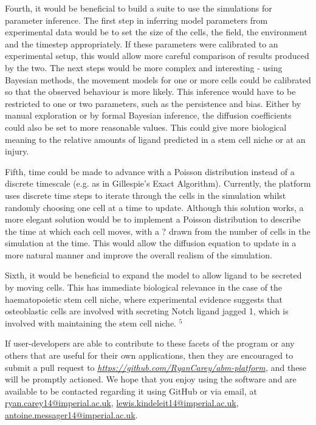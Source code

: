 \documentclass[12pt,a4paper]{report}
\begin{document}
Fourth, it would be beneficial to build a suite to use the simulations 
for parameter inference. The first step in inferring model parameters 
from experimental data would be to set the size of the cells, the field, 
the environment and the timestep appropriately. If these parameters were 
calibrated to an experimental setup, this would allow more careful 
comparison of results produced by the two. The next steps would be more 
complex and interesting - using Bayesian methods, the movement models 
for one or more cells could be calibrated so that the observed behaviour 
is more likely. This inference would have to be restricted to one or two 
parameters, such as the persistence and bias. Either by manual 
exploration or by formal Bayesian inference, the diffusion coefficients 
could also be set to more reasonable values. This could give more 
biological meaning to the relative amounts of ligand predicted in a stem 
cell niche or at an injury.

Fifth, time could be made to advance with a Poisson distribution instead 
of a discrete timescale (e.g. as in Gillespie's Exact Algorithm). 
Currently, the platform uses discrete time steps to iterate through the 
cells in the simulation whilst randomly choosing one cell at a time to 
update. Although this solution works, a more elegant solution would be 
to implement a Poisson distribution to describe the time at which each 
cell moves, with a ? drawn from the number of cells in the simulation at 
the time. This would allow the diffusion equation to update in a more 
natural manner and improve the overall realism of the simulation.

Sixth, it would be beneficial to expand the model to allow ligand to be 
secreted by moving cells. This has immediate biological relevance in the 
case of the haematopoietic stem cell niche, where experimental evidence 
suggests that osteoblastic cells are involved with secreting Notch 
ligand jagged 1, which is involved with maintaining the stem cell niche.
$^{5}$

If user-developers are able to contribute to these facets of the program 
or any others that are useful for their own applications, then they are 
encouraged to submit a pull request to {\itshape \underline{
https://github.com/RyanCarey/abm-platform}, }and these will be
{\itshape  }promptly actioned. We hope that you enjoy using the software 
and are available to be contacted regarding it using GitHub or via 
email, at \underline{ryan.carey14@imperial.ac.uk}, \underline{
lewis.kindeleit14@imperial.ac.uk}, \underline{
antoine.messager14@imperial.ac.uk}.
\end{document}
